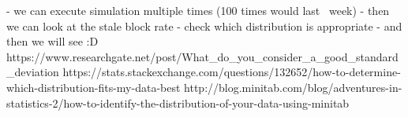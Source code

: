  - we can execute simulation multiple times (100 times would last ~week)
 - then we can look at the stale block rate
 - check which distribution is appropriate
 - and then we will see :D
 https://www.researchgate.net/post/What_do_you_consider_a_good_standard_deviation
 https://stats.stackexchange.com/questions/132652/how-to-determine-which-distribution-fits-my-data-best
 http://blog.minitab.com/blog/adventures-in-statistics-2/how-to-identify-the-distribution-of-your-data-using-minitab